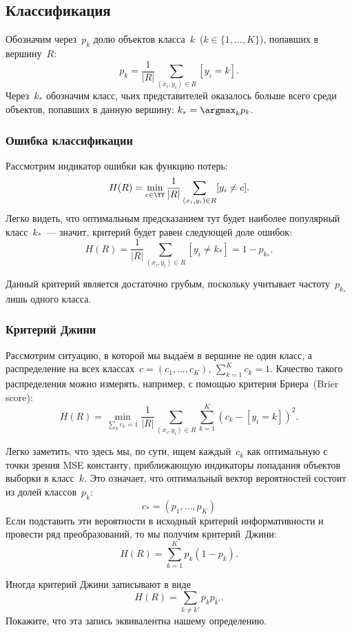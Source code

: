 \documentclass[12pt,fleqn]{article}
\begin{document}
\subsection{Классификация}
Обозначим через~$p_{k}$ долю объектов класса~$k$~($k \in \{1, \dots, K\}$), попавших в вершину~$R$:
\[
    p_{k}
    =
    \frac{1}{|R|}
    \sum_{(x_i, y_i) \in R}
        [y_i = k].
\]
Через~$k_*$ обозначим класс, чьих представителей оказалось больше всего среди объектов,
попавших в данную вершину: $k_* = \argmax_k p_{k}$.

\subsubsection{Ошибка классификации}
Рассмотрим индикатор ошибки как функцию потерь:
\[
    H(R)
    =
    \min_{c \in \YY}
    \frac{1}{|R|}
    \sum_{(x_i, y_i) \in R}
        [y_i \neq c].
\]
Легко видеть, что оптимальным предсказанием тут будет наиболее популярный класс~$k_*$~---
значит, критерий будет равен следующей доле ошибок:
\[
    H(R)
    =
    \frac{1}{|R|}
    \sum_{(x_i, y_i) \in R}
        [y_i \neq k_*]
    =
    1 - p_{k_*}.
\]

Данный критерий является достаточно грубым,
поскольку учитывает частоту~$p_{k_*}$ лишь одного класса.

\subsubsection{Критерий Джини}
Рассмотрим ситуацию, в которой мы выдаём в вершине не один класс,
а распределение на всех классах~$c = (c_1, \dots, c_K)$, $\sum_{k = 1}^{K} c_k = 1$.
Качество такого распределения можно измерять, например, с помощью критерия Бриера~(Brier score):
\[
    H(R)
    =
    \min_{\sum_k c_k = 1}
    \frac{1}{|R|}
    \sum_{(x_i, y_i) \in R}
    \sum_{k = 1}^{K}
        (c_k - [y_i = k])^2.
\]

Легко заметить, что здесь мы, по сути, ищем каждый~$c_k$ как оптимальную с точки зрения MSE константу,
приближающую индикаторы попадания объектов выборки в класс~$k$.
Это означает, что оптимальный вектор вероятностей состоит из долей классов~$p_k$:
\[
    c_* = (p_1, \dots, p_K)
\]
Если подставить эти вероятности в исходный критерий информативности
и провести ряд преобразований, то мы получим критерий~Джини:
\[
    H(R)
    =
    \sum_{k = 1}^{K}
        p_k (1 - p_k).
\]

\begin{vkProblem}
    Иногда критерий Джини записывают в виде
    \[
        H(R)
        =
        \sum_{k \neq k'}
            p_{k} p_{k'}.
    \]
    Покажите, что эта запись эквивалентна нашему определению.
\end{vkProblem}
\end{document}
